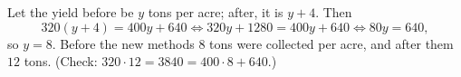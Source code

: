 Let the yield before be $y$ tons per acre; after, it is $y+4$. Then
\[
320(y+4)=400y+640\iff320y+1280=400y+640\iff80y=640,
\]
so $y=8$. Before the new methods $\boxed{8}$ tons were collected per acre, and after them $\boxed{12}$ tons. (Check: $320\cdot12=3840=400\cdot8+640$.)
